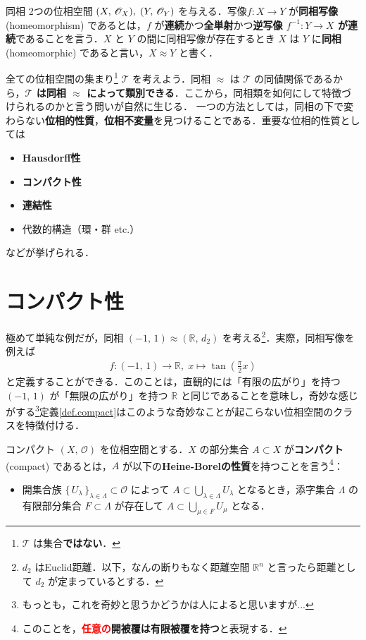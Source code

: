 \documentclass[geometry_main]{subfiles}
\begin{document}
\begin{mydef}[label=def.homeo]{同相}
	2つの位相空間 $(X,\, \mathscr{O}_{X}),\; (Y,\, \mathscr{O}_{Y})$ を与える．写像$f\colon X \to Y$ が\textbf{同相写像} (homeomorphism) であるとは，$f$ が\textbf{連続}かつ\textbf{全単射}かつ\textbf{逆写像 $f^{-1} \colon Y \to X$ が連続}であることを言う．$X$ と $Y$ の間に同相写像が存在するとき $X$ は $Y$ に\textbf{同相} (homeomorphic) であると言い，$X \approx Y$ と書く．
\end{mydef}

全ての位相空間の集まり\footnote{$\mathscr{T}$ は集合\textbf{ではない}．} $\mathscr{T}$ を考えよう．同相 $\approx$ は $\mathscr{T}$ の同値関係であるから，\textbf{$\mathscr{T}$ は同相 $\approx$ によって類別できる}．ここから，同相類を如何にして特徴づけられるのかと言う問いが自然に生じる．
一つの方法としては，同相の下で変わらない\textbf{位相的性質}，\textbf{位相不変量}を見つけることである．重要な位相的性質としては
\begin{itemize}
	\item \textbf{Hausdorff性}
	\item \textbf{コンパクト性}
	\item \textbf{連結性}
	\item 代数的構造（環・群 etc.）
\end{itemize}
などが挙げられる．

\section{コンパクト性}

極めて単純な例だが，同相 $(-1,\, 1) \approx (\mathbb{R},\, d_2)$ を考える\footnote{$d_2$ はEuclid距離．以下，なんの断りもなく距離空間 $\mathbb{R}^n$ と言ったら距離として $d_2$ が定まっているとする．}．実際，同相写像を例えば
\begin{align}
	f\colon (-1,\, 1) \to \mathbb{R},\; x \mapsto \tan(\frac{\pi}{2}x)
\end{align}
と定義することができる．このことは，直観的には「有限の広がり」を持つ $(-1,\, 1)$ が「無限の広がり」を持つ $\mathbb{R}$ と同じであることを意味し，奇妙な感じがする\footnote{もっとも，これを奇妙と思うかどうかは人によると思いますが...}定義\ref{def.compact}はこのような奇妙なことが起こらない位相空間のクラスを特徴付ける．

\begin{mydef}[label=def.compact]{コンパクト}
	$(X,\, \mathscr{O})$ を位相空間とする．$X$ の部分集合 $A \subset X$ が\textbf{コンパクト} (compact) であるとは，$A$ が以下の\textbf{Heine-Borelの性質}を持つことを言う\footnote{このことを，\textbf{\textcolor{red}{任意の}開被覆は有限被覆を持つ}と表現する．}：
	\begin{itemize}
		\item 開集合族 $\bigl\{\, U_\lambda \,\bigr\}_{\lambda \in \Lambda} \subset \mathscr{O}$ によって $\displaystyle A \subset \bigcup_{\lambda \in \Lambda} U_\lambda$ となるとき，添字集合 $\Lambda$ の有限部分集合 $F \subset \Lambda$ が存在して $\displaystyle A \subset \bigcup_{\mu \in F} U_\mu$ となる．
	\end{itemize}
\end{mydef}
\end{document}
